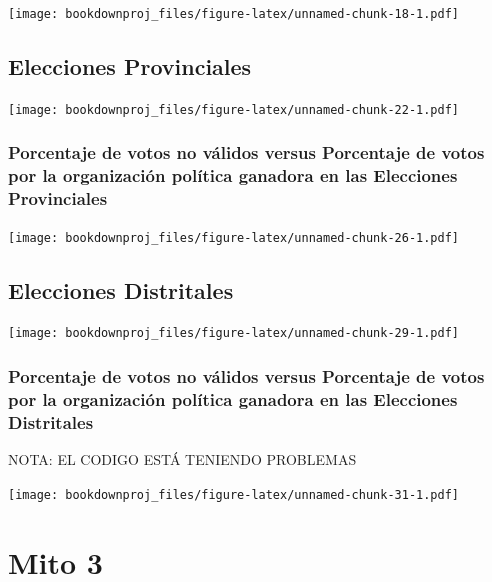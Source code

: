 \documentclass[
]{book}
\theoremstyle{definition}
\theoremstyle{definition}
\theoremstyle{definition}
\theoremstyle{definition}
\theoremstyle{remark}
\begin{document}
\texttt{[image: bookdownproj\_files/figure-latex/unnamed-chunk-18-1.pdf]}

\hypertarget{elecciones-provinciales}{%
\section{Elecciones Provinciales}\label{elecciones-provinciales}}

\texttt{[image: bookdownproj\_files/figure-latex/unnamed-chunk-22-1.pdf]}

\hypertarget{porcentaje-de-votos-no-vuxe1lidos-versus-porcentaje-de-votos-por-la-organizaciuxf3n-poluxedtica-ganadora-en-las-elecciones-provinciales}{%
\subsection{Porcentaje de votos no válidos versus Porcentaje de votos por la organización política ganadora en las Elecciones Provinciales}\label{porcentaje-de-votos-no-vuxe1lidos-versus-porcentaje-de-votos-por-la-organizaciuxf3n-poluxedtica-ganadora-en-las-elecciones-provinciales}}

\texttt{[image: bookdownproj\_files/figure-latex/unnamed-chunk-26-1.pdf]}

\hypertarget{elecciones-distritales}{%
\section{Elecciones Distritales}\label{elecciones-distritales}}

\texttt{[image: bookdownproj\_files/figure-latex/unnamed-chunk-29-1.pdf]}

\hypertarget{porcentaje-de-votos-no-vuxe1lidos-versus-porcentaje-de-votos-por-la-organizaciuxf3n-poluxedtica-ganadora-en-las-elecciones-distritales}{%
\subsection{Porcentaje de votos no válidos versus Porcentaje de votos por la organización política ganadora en las Elecciones Distritales}\label{porcentaje-de-votos-no-vuxe1lidos-versus-porcentaje-de-votos-por-la-organizaciuxf3n-poluxedtica-ganadora-en-las-elecciones-distritales}}

NOTA: EL CODIGO ESTÁ TENIENDO PROBLEMAS

\texttt{[image: bookdownproj\_files/figure-latex/unnamed-chunk-31-1.pdf]}

\hypertarget{mito-3}{%
\chapter{Mito 3}\label{mito-3}}
\end{document}
